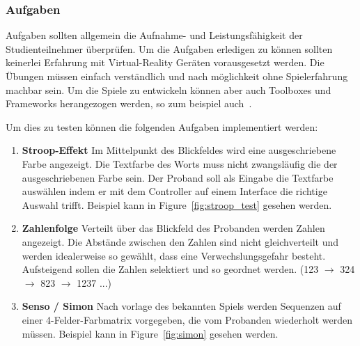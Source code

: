 \documentclass[a4paper, 11pt]{article}
\begin{document}
\subsubsection*{Aufgaben}
Aufgaben sollten allgemein die Aufnahme- und Leistungsfähigkeit der Studienteilnehmer überprüfen. Um die Aufgaben erledigen zu können sollten keinerlei Erfahrung mit Virtual-Reality Geräten vorausgesetzt werden. Die Übungen müssen einfach verständlich und nach möglichkeit ohne Spielerfahrung machbar sein. Um die Spiele zu entwickeln können aber auch Toolboxes und Frameworks herangezogen werden, so zum beispiel auch~\cite{devisch2018mini}.

Um dies zu testen können die folgenden Aufgaben implementiert werden:
\begin{enumerate}
    \item \textbf{Stroop-Effekt} Im Mittelpunkt des Blickfeldes wird eine ausgeschriebene Farbe angezeigt. Die Textfarbe des Worts muss nicht zwangsläufig die der ausgeschriebenen Farbe sein. Der Proband soll als Eingabe die Textfarbe auswählen indem er mit dem Controller auf einem Interface die richtige Auswahl trifft. Beispiel kann in Figure~\ref{fig:stroop_test} gesehen werden.
    \item \textbf{Zahlenfolge} Verteilt über das Blickfeld des Probanden werden Zahlen angezeigt. Die Abstände zwischen den Zahlen sind nicht gleichverteilt und werden idealerweise so gewählt, dass eine Verwechslungsgefahr besteht. Aufsteigend sollen die Zahlen selektiert und so geordnet werden. (123 $\rightarrow$ 324 $\rightarrow$ 823 $\rightarrow$ 1237 ...)
    \item \textbf{Senso / Simon} Nach vorlage des bekannten Spiels werden Sequenzen auf einer 4-Felder-Farbmatrix vorgegeben, die vom Probanden wiederholt werden müssen. Beispiel kann in Figure~\ref{fig:simon} gesehen werden.
\end{enumerate}
\end{document}
